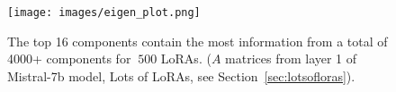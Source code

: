     
    
    
    

\begin{figure}
  \begin{center}
    \texttt{[image: images/eigen\_plot.png]}
  \end{center}
  \caption{\small{The top 16 components contain the most information from a total of 4000+ components for $~500$ LoRAs. ($A$ matrices from layer 1 of Mistral-7b model, Lots of LoRAs, see Section~\ref{sec:lotsofloras}).}}
  \label{fig:singular}
\end{figure}
